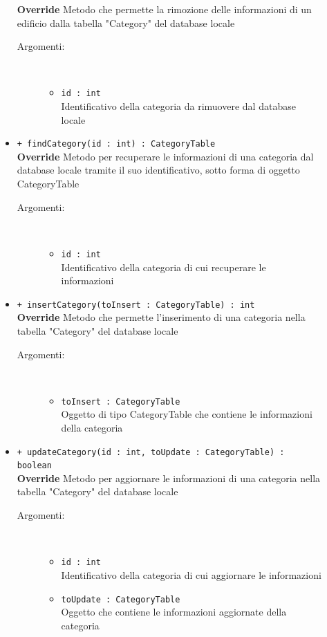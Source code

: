 \documentclass[../DefinizioneDiProdotto.tex]{subfiles}
\begin{document}
\begin{description}
\begin{itemize}
		\textbf{Override} Metodo che permette la rimozione delle informazioni di un edificio dalla tabella "Category" del database locale
		\begin{description}
			\item[Argomenti:] \
			\begin{itemize}
				\item \texttt{id : int}\\
				Identificativo della categoria da rimuovere dal database locale\end{itemize}
		\end{description}
		\item \texttt{+ findCategory(id : int) : CategoryTable}\\
		\textbf{Override} Metodo per recuperare le informazioni di una categoria dal database locale tramite il suo identificativo, sotto forma di oggetto CategoryTable
		\begin{description}
			\item[Argomenti:] \
			\begin{itemize}
				\item \texttt{id : int}\\
				Identificativo della categoria di cui recuperare le informazioni\end{itemize}
		\end{description}
		\item \texttt{+ insertCategory(toInsert : CategoryTable) : int}\\
		\textbf{Override} Metodo che permette l'inserimento di una categoria nella tabella "Category" del database locale
		\begin{description}
			\item[Argomenti:] \
			\begin{itemize}
				\item \texttt{toInsert : CategoryTable}\\
				Oggetto di tipo CategoryTable che contiene le informazioni della categoria\end{itemize}
		\end{description}
		\item \texttt{+ updateCategory(id : int, toUpdate : CategoryTable) : boolean}\\
		\textbf{Override} Metodo per aggiornare le informazioni di una categoria nella tabella "Category" del database locale
		\begin{description}
			\item[Argomenti:] \
			\begin{itemize}
				\item \texttt{id : int}\\
				Identificativo della categoria di cui aggiornare le informazioni\item \texttt{toUpdate : CategoryTable}\\
				Oggetto che contiene le informazioni aggiornate della categoria\end{itemize}
		\end{description}
	\end{itemize}
\end{description}
\end{document}
